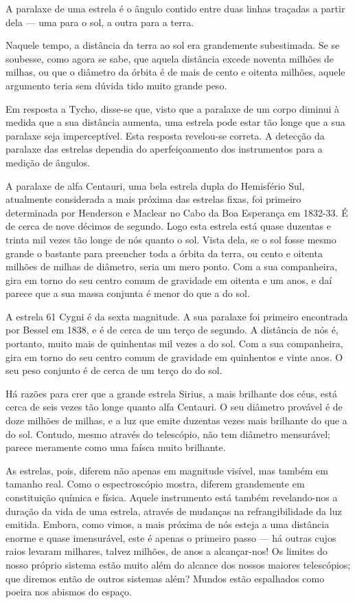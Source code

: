\documentclass[11pt,a5paper,twoside,openany]{book}
\begin{document}
A paralaxe de uma estrela é o ângulo contido entre duas linhas traçadas a partir dela — uma para o sol, a outra para a terra.

Naquele tempo, a distância da terra ao sol era grandemente subestimada. Se se soubesse, como agora se sabe, que aquela distância excede noventa milhões de milhas, ou que o diâmetro da órbita é de mais de cento e oitenta milhões, aquele argumento teria sem dúvida tido muito grande peso.

Em resposta a Tycho, disse-se que, visto que a paralaxe de um corpo diminui à medida que a sua distância aumenta, uma estrela pode estar tão longe que a sua paralaxe seja imperceptível. Esta resposta revelou-se correta. A detecção da paralaxe das estrelas dependia do aperfeiçoamento dos instrumentos para a medição de ângulos.

A paralaxe de alfa Centauri, uma bela estrela dupla do Hemisfério Sul, atualmente considerada a mais próxima das estrelas fixas, foi primeiro determinada por Henderson e Maclear no Cabo da Boa Esperança em 1832-33. É de cerca de nove décimos de segundo. Logo esta estrela está quase duzentas e trinta mil vezes tão longe de nós quanto o sol. Vista dela, se o sol fosse mesmo grande o bastante para preencher toda a órbita da terra, ou cento e oitenta milhões de milhas de diâmetro, seria um mero ponto. Com a sua companheira, gira em torno do seu centro comum de gravidade em oitenta e um anos, e daí parece que a sua massa conjunta é menor do que a do sol.

A estrela 61 Cygni é da sexta magnitude. A sua paralaxe foi primeiro encontrada por Bessel em 1838, e é de cerca de um terço de segundo. A distância de nós é, portanto, muito mais de quinhentas mil vezes a do sol. Com a sua companheira, gira em torno do seu centro comum de gravidade em quinhentos e vinte anos. O seu peso conjunto é de cerca de um terço do do sol.

Há razões para crer que a grande estrela Sirius, a mais brilhante dos céus, está cerca de seis vezes tão longe quanto alfa Centauri. O seu diâmetro provável é de doze milhões de milhas, e a luz que emite duzentas vezes mais brilhante do que a do sol. Contudo, mesmo através do telescópio, não tem diâmetro mensurável; parece meramente como uma faísca muito brilhante.

As estrelas, pois, diferem não apenas em magnitude visível, mas também em tamanho real. Como o espectroscópio mostra, diferem grandemente em constituição química e física. Aquele instrumento está também revelando-nos a duração da vida de uma estrela, através de mudanças na refrangibilidade da luz emitida. Embora, como vimos, a mais próxima de nós esteja a uma distância enorme e quase imensurável, este é apenas o primeiro passo — há outras cujos raios levaram milhares, talvez milhões, de anos a alcançar-nos! Os limites do nosso próprio sistema estão muito além do alcance dos nossos maiores telescópios; que diremos então de outros sistemas além? Mundos estão espalhados como poeira nos abismos do espaço.
\end{document}
